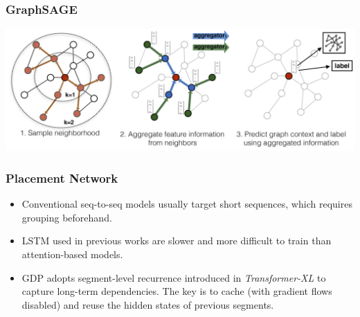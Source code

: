 \documentclass[12pt,aspectratio=169]{beamer}
\begin{document}
    \begin{frame}
        \frametitle{GraphSAGE}

        \centering
        \includegraphics[width=\textwidth]{graphsage.png}
    \end{frame}

    \begin{frame}
        \frametitle{Placement Network}

        \begin{itemize}
            \setlength{\itemsep}{.8em}
            \item Conventional seq-to-seq models usually target short sequences, which requires grouping beforehand.
            \item LSTM used in previous works are slower and more difficult to train than attention-based models.
            \item GDP adopts segment-level recurrence introduced in \textit{Transformer-XL} to capture long-term
                  dependencies. The key is to cache (with gradient flows disabled) and reuse the hidden states of
                  previous segments.
        \end{itemize}
    \end{frame}

\end{document}
